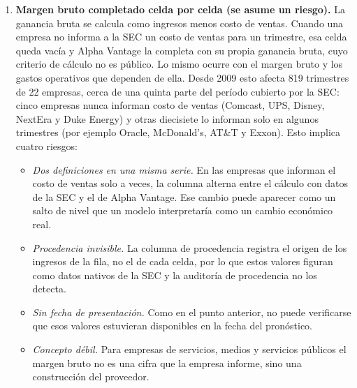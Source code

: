 \documentclass[12pt,letterpaper,oneside]{report}
\renewcommand{\_}{\UnderscoreOriginal\allowbreak}
\begin{document}
\begin{enumerate}
  \item \textbf{Margen bruto completado celda por celda (se asume un riesgo).} La ganancia bruta se calcula como ingresos menos costo de ventas. Cuando una empresa no informa a la SEC un costo de ventas para un trimestre, esa celda queda vacía y Alpha Vantage la completa con su propia ganancia bruta, cuyo criterio de cálculo no es público. Lo mismo ocurre con el margen bruto y los gastos operativos que dependen de ella. Desde 2009 esto afecta 819 trimestres de 22 empresas, cerca de una quinta parte del período cubierto por la SEC: cinco empresas nunca informan costo de ventas (Comcast, UPS, Disney, NextEra y Duke Energy) y otras diecisiete lo informan solo en algunos trimestres (por ejemplo Oracle, McDonald's, AT\&T y Exxon). Esto implica cuatro riesgos:
  \begin{itemize}
    \item \emph{Dos definiciones en una misma serie.} En las empresas que informan el costo de ventas solo a veces, la columna alterna entre el cálculo con datos de la SEC y el de Alpha Vantage. Ese cambio puede aparecer como un salto de nivel que un modelo interpretaría como un cambio económico real.
    \item \emph{Procedencia invisible.} La columna de procedencia registra el origen de los ingresos de la fila, no el de cada celda, por lo que estos valores figuran como datos nativos de la SEC y la auditoría de procedencia no los detecta.
    \item \emph{Sin fecha de presentación.} Como en el punto anterior, no puede verificarse que esos valores estuvieran disponibles en la fecha del pronóstico.
    \item \emph{Concepto débil.} Para empresas de servicios, medios y servicios públicos el margen bruto no es una cifra que la empresa informe, sino una construcción del proveedor.
  \end{itemize}

\end{enumerate}
\end{document}
